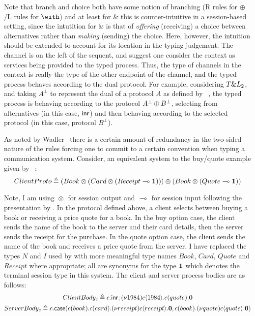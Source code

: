 \documentclass{mpaper}
\begin{document}
Note that branch and choice both have some notion of branching (R rules for
$\oplus$/L rules for $\with$) and at least for \& this is counter-intuitive in
a session-based setting, since the intutition for \& is that of
\emph{offering} (receiving) a choice between alternatives rather than
\emph{making} (sending) the choice. Here, however, the intuition should be
extended to account for its location in the typing judgement. The channel is
on the left of the sequent, and \citeauthor{Caires:2010:STI} suggest one
consider the context as services being provided to the typed process. Thus,
the type of channels in the context is really the type of the other endpoint
of the channel, and the typed process behaves according to the dual
protocol. For example, considering $T \& L_2$, and taking $A^\bot$ to
represent the dual of a protocol $A$ as defined by
\citeauthor{Wadler:2014}~\cite{Wadler:2014}, the typed process is behaving
according to the protocol ${A^\bot}\oplus{B^\bot}$, selecting from
alternatives (in this case, $\mathsf{inr}$) and then behaving according to the
selected protocol (in this case, protocol $B^\bot$).

As noted by Wadler~\cite{Wadler:2014} there is a certain amount of redundancy
in the two-sided nature of the rules forcing one to commit to a certain
convention when typing a communication system. Consider, an equivalent system
to the buy/quote example given by
\citeauthor{Caires:2010:STI}~\cite[\S~3]{Caires:2010:STI}:
\begin{gather*}
{ClientProto}\triangleq{{({Book}\otimes{({Card}\otimes{({Receipt}\multimap{\mathbf{1}})})})}\oplus{({Book}\otimes{({Quote}\multimap{\mathbf{1}})})}}
\end{gather*}

Note, I am using ${}\otimes{}$ for session output and ${}\multimap{}$ for session
input following the presentation by \citeauthor{Caires:2010:STI}. In the
protocol defined above, a client selects between buying a book or receiving a
price quote for a book. In the buy option case, the client sends the name of
the book to the server and their card details, then the server sends the
receipt for the purchase. In the quote option case, the client sends the name
of the book and receives a price quote from the server. I have replaced the
types $N$ and $I$ used by \citeauthor{Caires:2010:STI} with more meaningful
type names $Book$, $Card$, $Quote$ and $Receipt$ where appropriate; all are
synonyms for the type $\mathbf{1}$ which denotes the terminal session type in this
system. The client and server process bodies are as follows:
\begin{gather*}
{ClientBody_c}\triangleq{{c}.\mathsf{inr};{(\nu{1984}){c}\langle{1984}\rangle.{{c}({quote}).{\mathbf{0}}}}}\\
{ServerBody_c}\triangleq{{c}.\mathsf{case}({{c}({book}).{{c}({card}).{(\nu{receipt}){c}\langle{receipt}\rangle.{\mathbf{0}}}}},{{c}({book}).{(\nu{quote}){c}\langle{quote}\rangle.{\mathbf{0}}}})}
\end{gather*}
\end{document}
